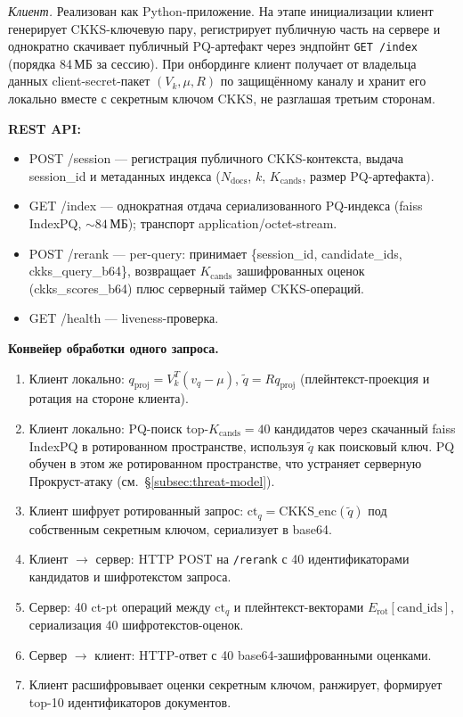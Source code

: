 \documentclass[a4paper, 12pt, oneside, openany]{article}
\begin{document}
\emph{Клиент.} Реализован как Python-приложение. На этапе инициализации клиент генерирует CKKS-ключевую пару, регистрирует публичную часть на сервере и однократно скачивает публичный PQ-артефакт через эндпойнт \texttt{GET /index} (порядка 84\,МБ за сессию). При онбординге клиент получает от владельца данных client-secret-пакет $(V_k, \mu, R)$ по защищённому каналу и хранит его локально вместе с секретным ключом CKKS, не разглашая третьим сторонам.

\textbf{REST API:}
\begin{itemize}
\item POST /session --- регистрация публичного CKKS-контекста, выдача session\_id и метаданных индекса ($N_{\mathrm{docs}}$, $k$, $K_{\mathrm{cands}}$, размер PQ-артефакта).
\item GET /index --- однократная отдача сериализованного PQ-индекса (faiss IndexPQ, $\sim 84$\,МБ); транспорт application/octet-stream.
\item POST /rerank --- per-query: принимает \{session\_id, candidate\_ids, ckks\_query\_b64\}, возвращает $K_{\mathrm{cands}}$ зашифрованных оценок (ckks\_scores\_b64) плюс серверный таймер CKKS-операций.
\item GET /health --- liveness-проверка.
\end{itemize}

\textbf{Конвейер обработки одного запроса.}
\begin{enumerate}
\item Клиент локально: $q_{\mathrm{proj}} = V_k^{T}(v_q - \mu)$, $\tilde q = R q_{\mathrm{proj}}$ (плейнтекст-проекция и ротация на стороне клиента).
\item Клиент локально: PQ-поиск top-$K_{\mathrm{cands}} = 40$ кандидатов через скачанный faiss IndexPQ в ротированном пространстве, используя $\tilde q$ как поисковый ключ. PQ обучен в этом же ротированном пространстве, что устраняет серверную Прокруст-атаку (см.\ §\ref{subsec:threat-model}).
\item Клиент шифрует ротированный запрос: $\mathrm{ct}_q = \mathrm{CKKS\_enc}(\tilde q)$ под собственным секретным ключом, сериализует в base64.
\item Клиент $\to$ сервер: HTTP POST на \texttt{/rerank} с 40 идентификаторами кандидатов и шифротекстом запроса.
\item Сервер: 40 ct-pt операций между $\mathrm{ct}_q$ и плейнтекст-векторами $E_{\mathrm{rot}}[\mathrm{cand\_ids}]$, сериализация 40 шифротекстов-оценок.
\item Сервер $\to$ клиент: HTTP-ответ с 40 base64-зашифрованными оценками.
\item Клиент расшифровывает оценки секретным ключом, ранжирует, формирует top-10 идентификаторов документов.
\end{enumerate}
\end{document}
